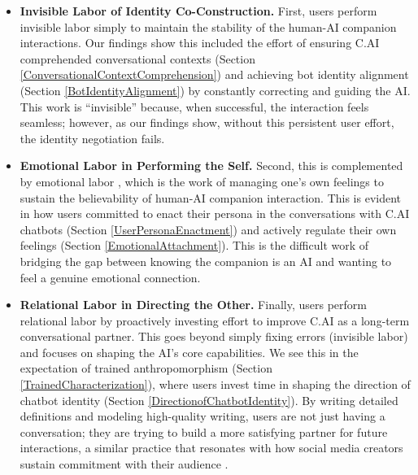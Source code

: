 \documentclass[sigconf, nonacm]{acmart}
\begin{document}
\begin{itemize}
    \item \textbf{Invisible Labor of Identity Co-Construction.} First, users perform invisible labor simply to maintain the stability of the human-AI companion interactions. Our findings show this included the effort of ensuring C.AI comprehended conversational contexts (Section \ref{ConversationalContextComprehension}) and achieving bot identity alignment (Section \ref{BotIdentityAlignment}) by constantly correcting and guiding the AI. This work is ``invisible'' because, when successful, the interaction feels seamless; however, as our findings show, without this persistent user effort, the identity negotiation fails.
    \item \textbf{Emotional Labor in Performing the Self.} Second, this is complemented by emotional labor \cite{grandey2015emotional, roemmich2023emotion}, which is the work of managing one's own feelings to sustain the believability of human-AI companion interaction. This is evident in how users committed to enact their persona in the conversations with C.AI chatbots (Section \ref{UserPersonaEnactment}) and actively regulate their own feelings (Section \ref{EmotionalAttachment}). This is the difficult work of bridging the gap between knowing the companion is an AI and wanting to feel a genuine emotional connection.
    \item \textbf{Relational Labor in Directing the Other.} Finally, users perform relational labor by proactively investing effort to improve C.AI as a long-term conversational partner. This goes beyond simply fixing errors (invisible labor) and focuses on shaping the AI's core capabilities. We see this in the expectation of trained anthropomorphism (Section \ref{TrainedCharacterization}), where users invest time in shaping the direction of chatbot identity (Section \ref{DirectionofChatbotIdentity}). By writing detailed definitions and modeling high-quality writing, users are not just having a conversation; they are trying to build a more satisfying partner for future interactions, a similar practice that resonates with how social media creators sustain commitment with their audience \cite{hair2022multi, ma2023multi}.
\end{itemize}
\end{document}
